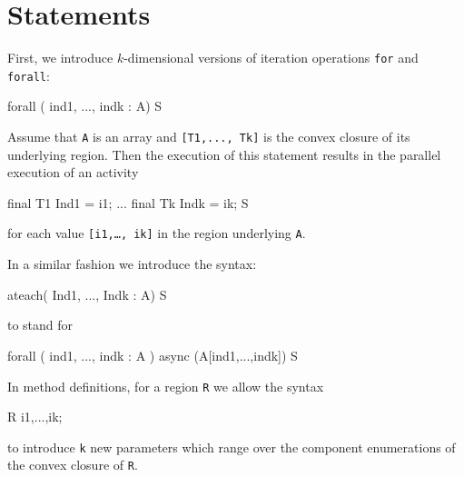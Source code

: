 \section{Statements}
First, we introduce  $k$-dimensional versions of iteration operations {\tt for} and {\tt forall}:

\begin{code}
   forall (  ind1, ..., indk : A) {S}
\end{code}

Assume that {\tt A} is an array and {\tt [T1,..., Tk]} is the convex closure of its underlying region. 
Then the execution of this statement results in the parallel execution of an activity

\begin{code}
   { final T1 Ind1 = i1; 
     ...
     final Tk Indk = ik;
     S
   }
\end{code}
\noindent for each value {\tt [i1,\ldots, ik]} in the region underlying {\tt A}.

In a similar fashion we introduce the syntax:
\begin{code}
   ateach( Ind1, ..., Indk : A) {S}
\end{code}
\noindent to stand for
\begin{code}
   forall (  ind1, ..., indk : A ) async (A[ind1,...,indk]) {S}
\end{code}

In method definitions, for a region {\tt R} we allow the syntax 
\begin{code}
     R i1,...,ik; 
\end{code} 

\noindent to introduce {\tt k} new parameters which range over the component enumerations of the convex closure of
{\tt R}.
